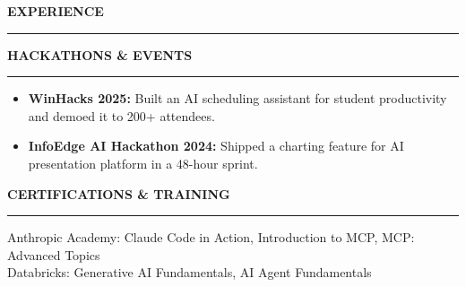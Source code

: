 \documentclass{resume}
\newcommand{\bulletgap}{-3pt}   %
\def\sectionskip{\vspace{12pt}}     %
\renewenvironment{rSection}[1]{%
  \sectionskip
  {\large\bfseries\MakeUppercase{#1}}%
  \sectionlineskip
  \hrule
  \begin{list}{}{\setlength{\leftmargin}{0em}}
  \item[]
}{%
  \end{list}
  \vspace{-0.5em}
}
\begin{document}
\begin{rSection}{Experience}
\begin{rSection}{Hackathons \& Events}
\begin{itemize}[leftmargin=0.15in]
    \itemsep \bulletgap {}
    \item \textbf{WinHacks 2025:} Built an AI scheduling assistant for student productivity and demoed it to 200+ attendees.
    \item \textbf{InfoEdge AI Hackathon 2024:} Shipped a charting feature for AI presentation platform in a 48-hour sprint.
\end{itemize}
\end{rSection}
\begin{rSection}{Certifications \& Training}
Anthropic Academy: Claude Code in Action, Introduction to MCP, MCP: Advanced Topics\\[2pt]
Databricks: Generative AI Fundamentals, AI Agent Fundamentals 
\end{rSection}
\end{rSection}
\end{document}
